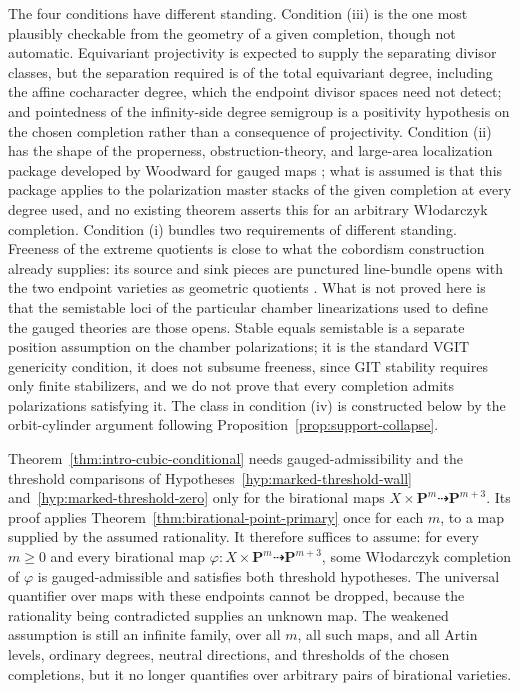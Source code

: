 The four conditions have different standing.  Condition \textup{(iii)} is the
one most plausibly checkable from the geometry of a given completion, though
not automatic.  Equivariant projectivity is expected to supply the separating
divisor classes, but the separation required is of the total equivariant
degree, including the affine cocharacter degree, which the endpoint divisor
spaces need not detect; and pointedness of the infinity-side degree semigroup
is a positivity hypothesis on the chosen completion rather than a consequence
of projectivity.  Condition \textup{(ii)} has the shape of the properness,
obstruction-theory, and large-area localization package developed by
Woodward for gauged maps \cite{WoodwardQKIII}; what is assumed is that this
package applies to the polarization master stacks of the given completion at
every degree used, and no existing theorem asserts this for an arbitrary
W{\l}odarczyk completion.  Condition \textup{(i)} bundles two requirements of
different standing.  Freeness of the extreme quotients is close to what the
cobordism construction already supplies: its source and sink pieces are
punctured line-bundle opens with the two endpoint varieties as geometric
quotients \cite[Proposition~2(B')]{Wlodarczyk}.  What is not proved here is
that the semistable loci of the particular chamber linearizations used to
define the gauged theories are those opens.  Stable equals semistable is a
separate position assumption on the chamber polarizations; it is the standard
VGIT genericity condition, it does not subsume freeness, since GIT stability
requires only finite stabilizers, and we do not prove that every completion
admits polarizations satisfying it.  The class in condition \textup{(iv)} is
constructed below by the orbit-cylinder argument following
Proposition~\ref{prop:support-collapse}.

\begin{remark}
\label{rem:endpoint-only}
Theorem~\ref{thm:intro-cubic-conditional} needs gauged-admissibility and
the threshold comparisons of Hypotheses~\ref{hyp:marked-threshold-wall}
and~\ref{hyp:marked-threshold-zero} only for the birational maps
\(X\times\mathbf P^m\dashrightarrow\mathbf P^{m+3}\).  Its proof applies
Theorem~\ref{thm:birational-point-primary} once for each \(m\), to a map
supplied by the assumed rationality.  It therefore suffices to assume: for
every \(m\geq0\) and every birational map
\(\varphi\colon X\times\mathbf P^m\dashrightarrow\mathbf P^{m+3}\), some
W{\l}odarczyk completion of \(\varphi\) is gauged-admissible and satisfies
both threshold hypotheses.  The universal quantifier over maps with these
endpoints cannot be dropped, because the rationality being contradicted
supplies an unknown map.  The weakened assumption is still an infinite
family, over all \(m\), all such maps, and all Artin levels, ordinary
degrees, neutral directions, and thresholds of the chosen completions, but
it no longer quantifies over arbitrary pairs of birational varieties.
\end{remark}

